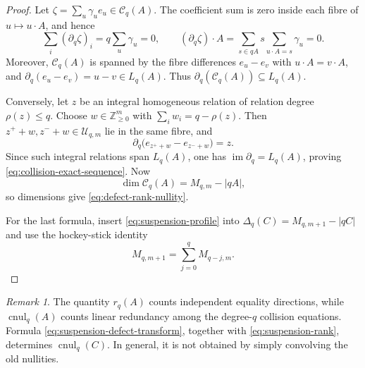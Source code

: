 \documentclass[11pt,reqno]{amsart}
\theoremstyle{definition}
\theoremstyle{remark}
\newtheorem{remark}[theorem]{Remark}
\begin{document}
\begin{proof}
Let $\zeta=\sum_u\gamma_ue_u\in\mathcal C_q(A)$.  The coefficient sum is
zero inside each fibre of $u\mapsto u\cdot A$, and hence
\[
 \sum_i(\partial_q\zeta)_i=q\sum_u\gamma_u=0,
 \qquad
 (\partial_q\zeta)\cdot A
 =\sum_{s\in qA}s\!\sum_{u\cdot A=s}\gamma_u=0.
\]
Moreover, $\mathcal C_q(A)$ is spanned by the fibre differences $e_u-e_v$
with $u\cdot A=v\cdot A$, and
$\partial_q(e_u-e_v)=u-v\in L_q(A)$.  Thus
$\partial_q(\mathcal C_q(A))\subseteq L_q(A)$.

Conversely, let $z$ be an integral homogeneous relation of relation degree
$\rho(z)\leq q$.  Choose $w\in\mathbb Z_{\geq0}^m$ with
$\sum_iw_i=q-\rho(z)$.  Then
$z^++w,z^-+w\in\mathcal U_{q,m}$ lie in the same fibre, and
\[
 \partial_q\bigl(e_{z^++w}-e_{z^-+w}\bigr)=z.
\]
Since such integral relations span $L_q(A)$, one has
$\operatorname{im}\partial_q=L_q(A)$, proving
\eqref{eq:collision-exact-sequence}.  Now
\[
 \dim\mathcal C_q(A)=M_{q,m}-|qA|,
\]
so dimensions give \eqref{eq:defect-rank-nullity}.

For the last formula, insert \eqref{eq:suspension-profile} into
$\Delta_q(C)=M_{q,m+1}-|qC|$ and use the hockey-stick identity
\[
 M_{q,m+1}=\sum_{j=0}^{q}M_{q-j,m}.
\]
\end{proof}

\begin{remark}\label{rem:collision-nullity-scope}
The quantity $r_q(A)$ counts independent equality directions, while
$\operatorname{cnul}_q(A)$ counts linear redundancy among the degree-$q$
collision equations.  Formula \eqref{eq:suspension-defect-transform},
together with \eqref{eq:suspension-rank}, determines
$\operatorname{cnul}_q(C)$.  In general, it is not obtained by simply
convolving the old nullities.
\end{remark}
\end{document}
